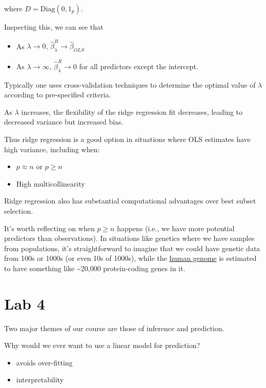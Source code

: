 \documentclass[
  letterpaper,
  DIV=11,
  numbers=noendperiod]{scrreport}
\providecommand{\tightlist}{%
  \setlength{\itemsep}{0pt}\setlength{\parskip}{0pt}}\usepackage{longtable,booktabs,array}
\begin{document}
where \(D = \text{Diag}(0,1_p)\).

Inspecting this, we can see that

\begin{itemize}
\tightlist
\item
  As \(\lambda \to 0, \, \hat\beta_\lambda^R \to \hat\beta_{OLS}\)
\item
  As \(\lambda \to \infty, \, \hat \beta_{\lambda}^R \to 0\) for all
  predictors except the intercept.
\end{itemize}

Typically one uses cross-validation techniques to determine the optimal
value of \(\lambda\) according to pre-specified criteria.

As \(\lambda\) increases, the flexibility of the ridge regression fit
decreases, leading to decreased variance but increased bias.

Thus ridge regression is a good option in situations where OLS estimates
have high variance, including when:

\begin{itemize}
\tightlist
\item
  \(p \approx n\) or \(p \geq n\)
\item
  High multicollinearity
\end{itemize}

Ridge regression also has substantial computational advantages over best
subset selection.

It's worth reflecting on when \(p \geq n\) happens (i.e., we have more
potential predictors than observations). In situations like genetics
where we have samples from populations, it's straightforward to imagine
that we could have genetic data from 100s or 1000s (or even 10s of
1000s), while the
\href{https://en.wikipedia.org/wiki/Human_genome}{human genome} is
estimated to have something like \textasciitilde20,000 protein-coding
genes in it.


\hypertarget{lab-4}{%
\chapter{Lab 4}\label{lab-4}}

Two major themes of our course are those of inference and prediction.

Why would we ever want to use a linear model for prediction?

\begin{itemize}
\tightlist
\item
  avoids over-fitting
\item
  interpretability
\end{itemize}
\end{document}
